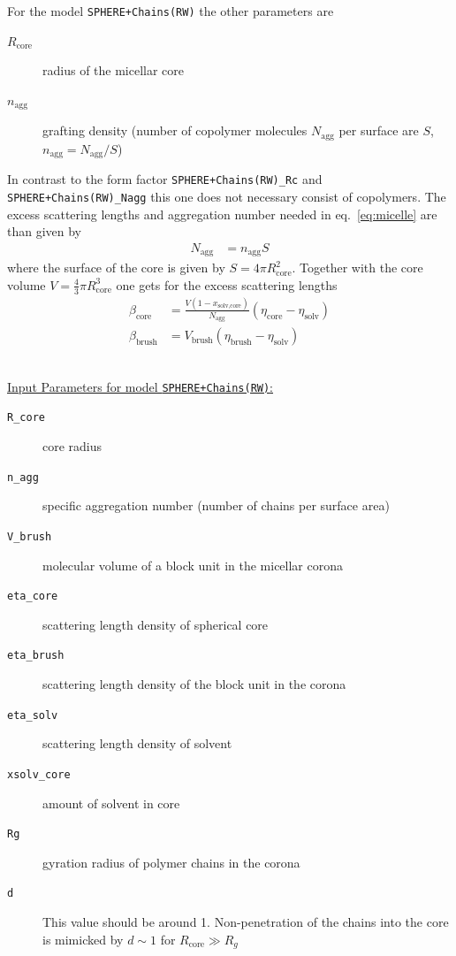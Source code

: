 \vspace{10mm}

\noindent
For the model \texttt{SPHERE+Chains(RW)} the other parameters are
\begin{description}
\item[$R_\text{core}$] radius of the micellar core
\item[$n_\text{agg}$] grafting density (number of copolymer molecules
$N_\text{agg}$ per surface are $S$, $n_\text{agg}=N_\text{agg}/S$)
\end{description}

\noindent
In contrast to the form factor \texttt{SPHERE+Chains(RW)\_Rc} and \texttt{SPHERE+Chains(RW)\_Nagg}
this one does not necessary consist of copolymers.
The excess scattering lengths and aggregation number needed in eq.\
\ref{eq:micelle} are than given by
\begin{align}
N_\text{agg} &= n_\text{agg} S
\end{align}
where the surface of the core is given by $S=4\pi R_\text{core}^2$. Together with the
core volume  $V =\frac{4}{3}\pi R_\text{core}^3$ one gets for the excess scattering
lengths
\begin{align}
\beta_\text{core} &= \frac{V (1-x_\text{solv,core})}{N_\text{agg}}
(\eta_\text{core}-\eta_\text{solv}) \\
\beta_\text{brush} &= V_\text{brush} (\eta_\text{brush}-\eta_\text{solv})
\end{align}

\vspace{3mm}

\hspace{1pt}\\
\uline{Input Parameters for model \texttt{SPHERE+Chains(RW)}:}\\
\begin{description}
\item[\texttt{R\_core}] core radius
\item[\texttt{n\_agg}] specific aggregation number (number of chains per surface area)
\item[\texttt{V\_brush}]  molecular volume of a block unit in the micellar corona
\item[\texttt{eta\_core}] scattering length density of spherical core
\item[\texttt{eta\_brush}] scattering length density of the block unit in the corona
\item[\texttt{eta\_solv}] scattering length density of solvent
\item[\texttt{xsolv\_core}] amount of solvent in core
\item[\texttt{Rg}] gyration radius of polymer chains in the corona
\item[\texttt{d}] This value should be around 1. Non-penetration of the chains
into the core is mimicked by $d\sim 1$ for $R_\text{core}\gg R_g$
\end{description}

